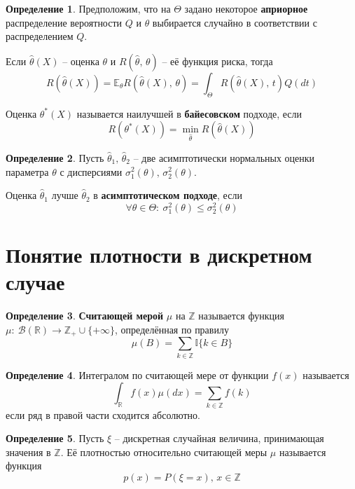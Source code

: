 \documentclass[a4paper,12pt]{article}
\renewcommand{\leq}{\ensuremath{\leqslant}}
\theoremstyle{plain}
\theoremstyle{definition}
\newtheorem{definition}{Определение}[section]
\theoremstyle{remark}
\begin{document}
\begin{definition}
  Предположим, что на $\Theta$ задано некоторое \textbf{априорное} распределение вероятности $Q$ и $\theta$ выбирается случайно в соответствии с распределением $Q$.

  Если $\hat{\theta}(X)$ -- оценка $\theta$ и $R(\hat{\theta},\, \theta)$ -- её функция риска, тогда 
  \[
    R(\hat{\theta}(X)) = \mathbb{E}_\theta R(\hat{\theta}(X),\, \theta) = \int_\Theta R(\hat{\theta}(X),\, t)Q(dt)
  \]

  Оценка $\theta^*(X)$ называется наилучшей в \textbf{байесовском} подходе, если
  \[
    R(\theta^*(X)) = \min_{\hat{\theta}}R(\hat{\theta}(X))
  \]
\end{definition}

\begin{definition}
  Пусть $\hat{\theta}_1,\, \hat{\theta}_2$ -- две асимптотически нормальных оценки параметра $\theta$ с дисперсиями $\sigma_1^2(\theta),\, \sigma_2^2(\theta)$. 

  Оценка $\hat{\theta}_1$ лучше $\hat{\theta}_2$ в \textbf{асимптотическом подходе}, если
  \[
    \forall \theta \in \Theta :\: \sigma_1^2(\theta) \leq \sigma_2^2(\theta)
  \]
\end{definition}

\section{Понятие плотности в дискретном случае}
\begin{definition}
  \textbf{Считающей мерой} $\mu$ на $\mathbb{Z}$ называется функция $\mu :\: \mathcal{B}(\mathbb{R}) \to \mathbb{Z}_+ \cup \{+\infty\}$, определённая по правилу
  \[
    \mu(B) = \sum_{k \in \mathbb{Z}} \mathbb{I}\{k \in B\}
  \]
\end{definition}

\begin{definition}
  Интегралом по считающей мере от функции $f(x)$ называется 
  \[
    \int_\mathbb{R}f(x)\mu(dx) = \sum_{k \in \mathbb{Z}}f(k)
  \]
  если ряд в правой части сходится абсолютно.
\end{definition}

\begin{definition}
  Пусть $\xi$ -- дискретная случайная величина, принимающая значения в $\mathbb{Z}$. Её плотностью относительно считающей меры $\mu$ называется функция
  \[
    p(x) = P(\xi = x),\, x \in \mathbb{Z}
  \]
\end{definition}
\end{document}
